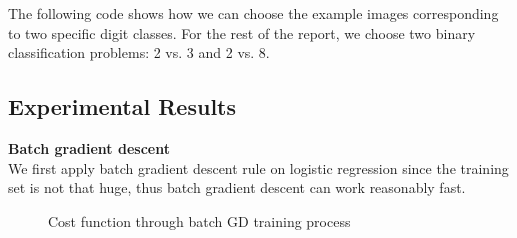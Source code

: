 \documentclass{article} %
\begin{document}
The following code shows how we can choose the example images corresponding to two specific digit classes. For the rest of the report, we choose two binary classification problems: 2 vs. 3 and 2 vs. 8.

\subsection{Experimental Results}
\textbf{Batch gradient descent}\\
We first apply batch gradient descent rule on logistic regression since the training set is not that huge, thus batch gradient descent can work reasonably fast. 

\begin{figure}%
	\centering
	\qquad
	\caption{Cost function through batch GD training process}%
	\label{fig:P1}%
\end{figure}
\end{document}
